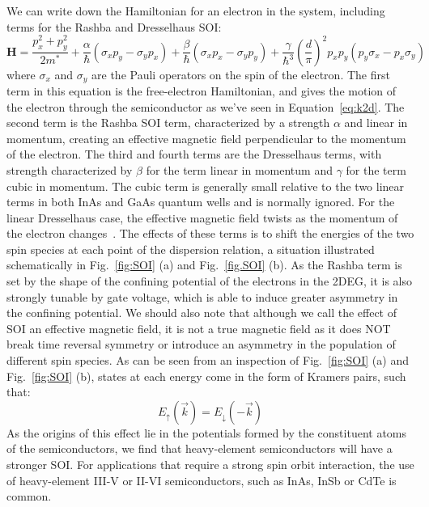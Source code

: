 We can write down the Hamiltonian for an electron in the system, including terms for the Rashba and Dresselhaus SOI:
\begin{equation}
  \mathbf{H} = \frac{p_x^2 + p_y^2}{2m^*} + \frac{\alpha}{\hbar}(\sigma_xp_y - \sigma_yp_x) + \frac{\beta}{\hbar}(\sigma_x p_x - \sigma_y p_y) +
  \frac{\gamma}{\hbar^3}\left(\frac{d}{\pi}\right)^2 p_x p_y (p_y\sigma_x-p_x\sigma_y)
\end{equation}
where $\sigma_x$ and $\sigma_y$ are the Pauli operators on the spin of the electron. The first term in this equation is the free-electron Hamiltonian,
and gives the motion of the electron through the semiconductor as we've seen in Equation~\ref{eq:k2d}. The second term is the Rashba SOI term, characterized
by a strength $\alpha$ and linear in momentum, creating an effective magnetic field perpendicular to the momentum of the electron. The third and fourth terms
are the Dresselhaus terms, with strength characterized by $\beta$ for the term linear in momentum and $\gamma$ for the term cubic in momentum. The cubic term is
generally small relative to the two linear terms in both InAs and GaAs quantum wells and is normally ignored. For the linear Dresselhaus case, the effective magnetic field twists
as the momentum of the electron changes~\cite{PhysRev.100.580}. The effects of these terms is to shift the energies of the two spin species at each point of the dispersion
relation, a situation illustrated schematically in Fig.~\ref{fig:SOI} (a) and Fig.~\ref{fig.SOI} (b). As the Rashba term is set by the shape
of the confining potential of the electrons in the 2DEG, it is also strongly tunable by gate voltage, which is able to induce greater asymmetry in the confining potential.
We should also note that although we call the effect of SOI an effective magnetic field, it is not a true magnetic field as
it does NOT break time reversal symmetry or introduce an asymmetry in the population of different spin species. As can be seen from an inspection of
Fig.~\ref{fig:SOI} (a) and Fig.~\ref{fig:SOI} (b), states at each energy come in the form of Kramers pairs, such that:
\begin{equation}
  E_\uparrow(\vec k) = E_\downarrow(-\vec k)
\end{equation}
As the origins of this effect lie in the potentials formed by the constituent atoms of the semiconductors, we find that heavy-element semiconductors
will have a stronger SOI. For applications that require a strong spin orbit interaction, the use of heavy-element III-V or II-VI semiconductors, such
as InAs, InSb or CdTe is common.

